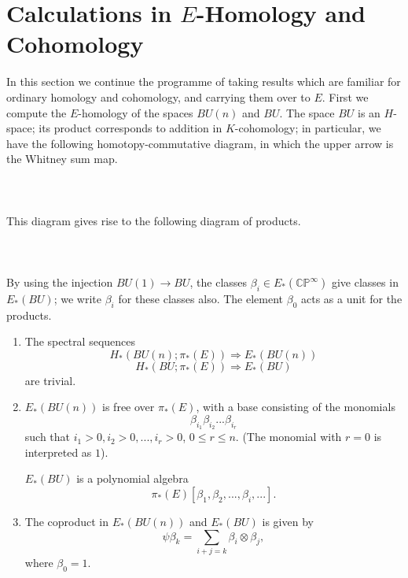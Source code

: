 \documentclass[../main]{subfiles}
\begin{document}
\label{sec:p2c4}
\renewcommand{\labelenumi}{(\roman{enumi})}

\chapter{Calculations in $E$-Homology and Cohomology}

In this section we continue the programme of taking results which are familiar for ordinary homology and cohomology, and carrying them over to $E$. First we compute the $E$-homology of the spaces $BU(n)$ and $BU$. The space $BU$ is an $H$-space; its product corresponds to addition in $K$-cohomology; in particular, we have the following homotopy-commutative diagram, in which the upper arrow is the Whitney sum map.
~\\~\\
~\\~\\
This diagram gives rise to the following diagram of products.
~\\~\\
~\\~\\

By using the injection $BU(1)\longrightarrow BU$, the classes $\beta_i\in E_\ast(\mathbb{CP}^\infty)$ give classes in $E_\ast(BU)$; we write $\beta_i$ for these classes also. The element $\beta_0$ acts as a unit for the products.
\begin{lemma}
\label{lem:p2c04.1}
\begin{enumerate}
    \item The spectral sequences
    $$H_\ast(BU(n);\pi_\ast(E))\Longrightarrow E_\ast(BU(n))$$
    $$H_\ast(BU;\pi_\ast(E))\Longrightarrow E_\ast(BU)$$
    are trivial.
    \item $E_\ast(BU(n))$ is free over $\pi_\ast(E)$, with a base consisting of the monomials
    $$\beta_{i_1}\beta_{i_2}...\beta_{i_r}$$
    such that $i_1>0, i_2>0, ..., i_r>0$, $0\leq r \leq n$. (The monomial with $r=0$ is interpreted as $1$).
    
    $E_\ast(BU)$ is a polynomial algebra
    $$\pi_\ast(E)[\beta_1,\beta_2,...,\beta_i, ...].$$
    \item The coproduct in $E_\ast(BU(n))$ and $E_\ast(BU)$ is given by 
    $$\psi\beta_k=\sum_{i+j=k}\beta_i\otimes\beta_j,$$
    where $\beta_0=1$.
\end{enumerate}
\end{lemma}
\end{document}
